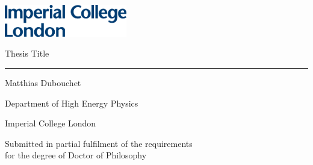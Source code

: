 \documentclass[12pt, a4paper, twoside]{report}
\begin{document}
\thispagestyle{empty}
\includegraphics[width=0.4\textwidth]{IMP_ML_1CS_4CP.eps}
\vfill
\begin{center}
    
    {\huge Thesis Title}
    
    \rule{7cm}{1pt}
    \vspace{2cm}
    
    {\Large Matthias Dubouchet}
    \vspace{1cm}
    
    {\Large Department of High Energy Physics
    
    Imperial College London}
    \vspace{3cm}
    
    {\large Submitted in partial fulfilment of the requirements\\for the degree of Doctor of Philosophy}
    
\end{center}

\vfill
\clearpage

\shipout\null






\tableofcontents
\printglossary[type=\acronymtype]
\clearpage












\printbibliography

\listoffigures
\listoftables
\end{document}
